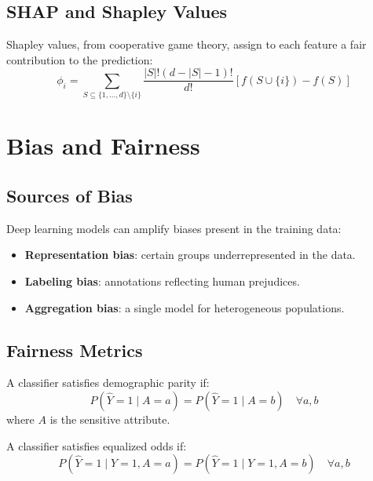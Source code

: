 \subsection{SHAP and Shapley Values}

Shapley values, from cooperative game theory, assign to each feature a fair contribution to the prediction:
\[
\phi_i = \sum_{S \subseteq \{1,\ldots,d\} \setminus \{i\}} \frac{|S|!(d-|S|-1)!}{d!}\left[f(S \cup \{i\}) - f(S)\right]
\]

\section{Bias and Fairness}
\label{sec:fairness}

\subsection{Sources of Bias}

\begin{warning}
Deep learning models can amplify biases present in the training data:
\begin{itemize}
\item \textbf{Representation bias}: certain groups underrepresented in the data.
\item \textbf{Labeling bias}: annotations reflecting human prejudices.
\item \textbf{Aggregation bias}: a single model for heterogeneous populations.
\end{itemize}
\end{warning}

\subsection{Fairness Metrics}

\begin{definition}
A classifier satisfies demographic parity if:
\[
P(\hat{Y} = 1 \mid A = a) = P(\hat{Y} = 1 \mid A = b) \quad \forall a, b
\]
where $A$ is the sensitive attribute.
\end{definition}

\begin{definition}
A classifier satisfies equalized odds if:
\[
P(\hat{Y} = 1 \mid Y = 1, A = a) = P(\hat{Y} = 1 \mid Y = 1, A = b) \quad \forall a, b
\]
\end{definition}

